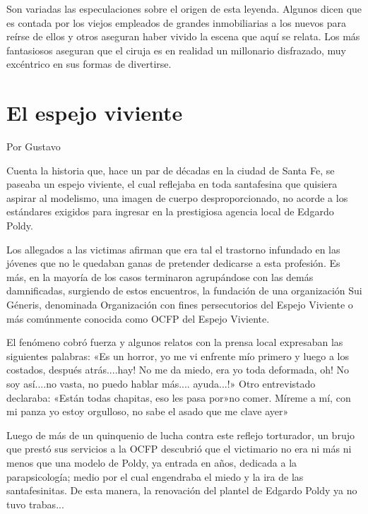 \documentclass[11pt,twoside,openright,a5paper]{book}
\begin{document}
Son variadas las especulaciones sobre el origen de esta leyenda. Algunos dicen que es contada por los viejos empleados de grandes inmobiliarias a los nuevos para reírse de ellos y otros aseguran haber vivido la escena que aquí se relata. Los más fantasiosos aseguran que el ciruja es en realidad un millonario disfrazado, muy excéntrico en sus formas de divertirse.

\section*{El espejo viviente}

\begin{flushright}Por Gustavo\end{flushright}


Cuenta la historia que, hace un par de décadas en la ciudad de Santa Fe, se paseaba un espejo viviente, el cual reflejaba en toda santafesina que quisiera aspirar al modelismo, una imagen de cuerpo desproporcionado, no acorde a los estándares exigidos para ingresar en la prestigiosa agencia local de Edgardo Poldy.

Los allegados a las victimas afirman que era tal el trastorno infundado en las jóvenes que no le quedaban ganas de pretender dedicarse a esta profesión. Es más, en la mayoría de los casos terminaron agrupándose con las demás damnificadas, surgiendo de estos encuentros, la fundación de una organización Sui Géneris, denominada Organización con fines persecutorios del Espejo Viviente o más comúnmente conocida como OCFP del Espejo Viviente.

El fenómeno cobró fuerza y algunos relatos con la prensa local expresaban las siguientes palabras: «Es un horror, yo me vi enfrente mío primero y luego a los costados, después atrás....hay! No me da miedo, era yo toda deformada, oh! No soy así....no vasta, no puedo hablar más.... ayuda...!» Otro entrevistado declaraba: «Están todas chapitas, eso les pasa por»no comer. Míreme a mí, con mi panza yo estoy orgulloso, no sabe el asado que me clave ayer»

Luego de más de un quinquenio de lucha contra este reflejo torturador, un brujo que prestó sus servicios a la OCFP descubrió que el victimario no era ni más ni menos que una modelo de Poldy, ya entrada en años, dedicada a la parapsicología; medio por el cual engendraba el miedo y la ira de las santafesinitas. De esta manera, la renovación del plantel de Edgardo Poldy ya no tuvo trabas...
\end{document}
